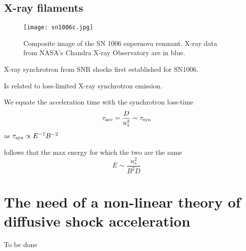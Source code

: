 \subsection{X-ray filaments}

\begin{figure}[t!]
\centering
\texttt{[image: sn1006c.jpg]}
\caption{Composite image of the SN 1006 supernova remnant. X-ray data from NASA’s Chandra X-ray Observatory are in blue.}
\end{figure}

X-ray synchrotron from SNR shocks first established for SN1006.

Is related to loss-limited X-ray synchrotron emission.

We equate the acceleration time with the synchrotron loss-time
\[
\tau_{\rm acc} = \frac{D}{u_s^2} \sim \tau_{\rm syn}
\]
%
as \( \tau_{\rm syn} \propto E^{-1} B^{-2} \)

follows that the max energy for which the two are the same
%
\[
E \sim \frac{u_s^2}{B^2 D} 
\]


\section{The need of a non-linear theory of diffusive shock acceleration}

{\color{red}To be done}

